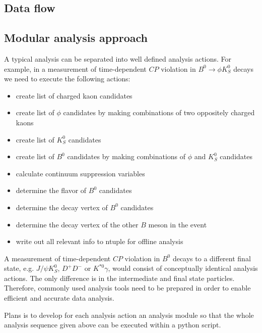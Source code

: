 \subsection{Data flow}

\subsection{Modular analysis approach}

A typical analysis can be separated into well defined analysis actions. For example, in a measurement of time-dependent $CP$ violation
in $B^0\to \phi K^0_S$ decays we need to execute the following actions:
\begin{itemize}
\item create list of charged kaon candidates
\item create list of $\phi$ candidates by making combinations of two oppositely charged kaons
\item create list of $K^0_S$ candidates
\item create list of $B^0$ candidates by making combinations of $\phi$ and $K^0_S$ candidates
\item calculate continuum suppression variables
\item determine the flavor of $B^0$ candidates
\item determine the decay vertex of $B^0$ candidates
\item determine the decay vertex of the other $B$ meson in the event
\item write out all relevant info to ntuple for offline analysis
\end{itemize}
A measurement of time-dependent $CP$ violation in $B^0$ decays to a different final state, e.g. $J/\psi K^0_S$, $D^+D^-$ or 
$K^{\ast0}\gamma$, would consist of conceptually identical analysis actions. The only difference is in the intermediate and final state
particles. Therefore, commonly used analysis tools need to be prepared in order to enable efficient and accurate data analysis. 

Plans is to develop for each analysis action an analysis module so that the whole analysis sequence given above can be executed
within a python script.